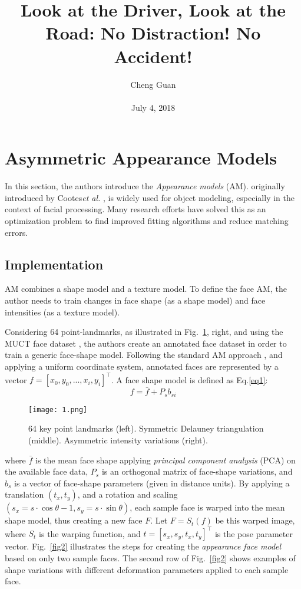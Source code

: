 \documentclass[10pt,twocolumn,letterpaper]{article}
\title{Look at the Driver, Look at the Road: No Distraction! No Accident!}
\author{Cheng Guan\\\\
July 4, 2018}
\begin{document}
\maketitle
\section{Asymmetric Appearance Models}
In this section, the authors introduce the \emph{Appearance models} (AM).
originally introduced by Cootes\emph{et al.} \cite{cootes2001active}, is widely used for object modeling, especially in the context of facial processing. Many research efforts have solved this as an optimization problem to find improved fitting algorithms and reduce matching errors.
\subsection{Implementation}
AM combines a shape model and a texture model. To define the face AM, the author needs to train changes in face shape (as a shape model) and face intensities (as a texture model).
\par
Considering 64 point-landmarks, as illustrated in Fig.~\ref{fig1}, right, and using the MUCT face dataset \cite{milborrow2010muct}, the authors create an annotated face dataset in order to train a generic face-shape model. Following the standard AM approach \cite{cootes2001active}, and applying a uniform coordinate system, annotated faces are represented by a vector $f = {\left[x_0,y_0,...,x_i,y_i\right]}^\top$. A face shape model is defined as Eq.\ref{eq1}:
\begin{equation}
f = \bar{f} + P_{s}b_{si}
\label{eq1}
\end{equation}
\begin{figure}[t]
  \centering
  \texttt{[image: 1.png]}\\
  \caption{64 key point landmarks (left). Symmetric Delauney triangulation (middle). Asymmetric intensity variations (right).}
  \label{fig1}
\end{figure}where $\bar{f}$ is the mean face shape applying \emph{principal component analysis} (PCA) on the available face data, $P_s$ is an orthogonal matrix of face-shape variations, and $b_s$ is a vector of face-shape parameters (given in distance units). By applying a translation $\left(t_x,t_y\right)$, and a rotation and scaling $\left(s_x = s\cdot\cos\theta-1,s_y=s\cdot\sin\theta\right)$, each sample face is warped into the mean shape model, thus creating a new face $F$. Let $F=S_t\left(f\right)$ be this warped image, where $S_t$ is the warping function, and $t = {\left[s_x,s_y,t_x,t_y\right]}^\top$ is the pose parameter vector. Fig.~\ref{fig2}  illustrates the steps for creating the \emph{appearance face model} based on only two sample faces. The second row of Fig.~\ref{fig2} shows examples of shape variations with different deformation parameters applied to each sample face.
\end{document}
